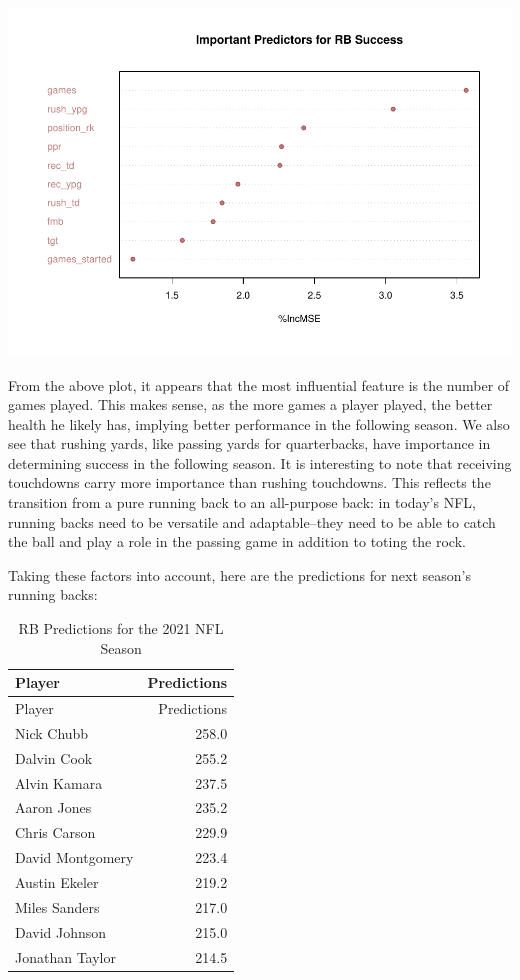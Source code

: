 \documentclass[
]{article}
\begin{document}
\begin{center}\includegraphics[width=0.85\linewidth]{stats_199_final_report_files/figure-latex/unnamed-chunk-8-1} \end{center}

From the above plot, it appears that the most influential feature is the
number of games played. This makes sense, as the more games a player
played, the better health he likely has, implying better performance in
the following season. We also see that rushing yards, like passing yards
for quarterbacks, have importance in determining success in the
following season. It is interesting to note that receiving touchdowns
carry more importance than rushing touchdowns. This reflects the
transition from a pure running back to an all-purpose back: in today's
NFL, running backs need to be versatile and adaptable--they need to be
able to catch the ball and play a role in the passing game in addition
to toting the rock.

Taking these factors into account, here are the predictions for next
season's running backs:

\begin{longtable}[]{@{}lr@{}}
\caption{RB Predictions for the 2021 NFL Season}\tabularnewline
\toprule
Player & Predictions \\
\midrule
\endfirsthead
\toprule
Player & Predictions \\
\midrule
\endhead
Nick Chubb & 258.0 \\
Dalvin Cook & 255.2 \\
Alvin Kamara & 237.5 \\
Aaron Jones & 235.2 \\
Chris Carson & 229.9 \\
David Montgomery & 223.4 \\
Austin Ekeler & 219.2 \\
Miles Sanders & 217.0 \\
David Johnson & 215.0 \\
Jonathan Taylor & 214.5 \\
\bottomrule
\end{longtable}
\end{document}
